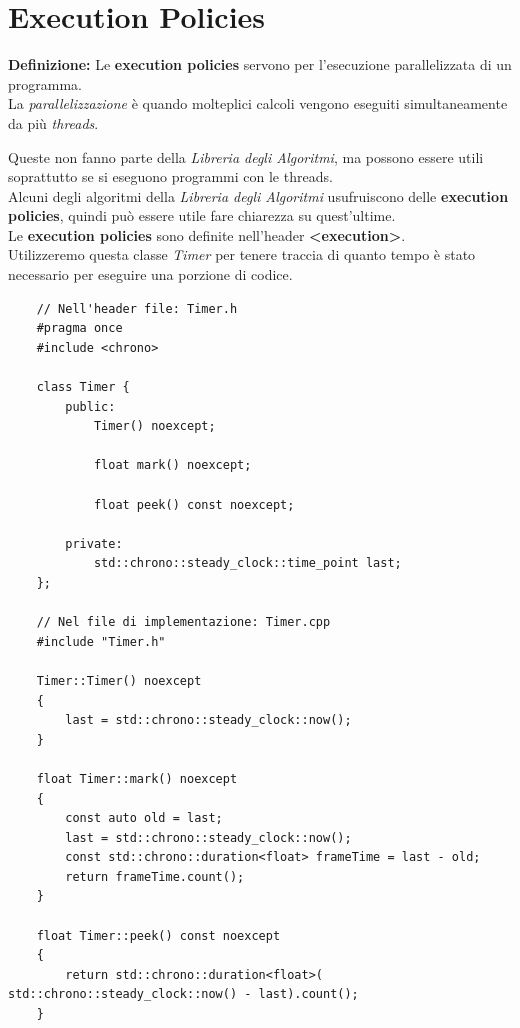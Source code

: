 
\newpage

\section{Execution Policies}

\textsf{\small \textbf{Definizione: } Le \textbf{execution policies} servono per l'esecuzione parallelizzata di un programma. } \\

\textsf{\small La \emph{parallelizzazione} è quando molteplici calcoli vengono eseguiti simultaneamente da più \emph{threads}. } \break

\textsf{\small Queste non fanno parte della \emph{Libreria degli Algoritmi}, ma possono essere utili soprattutto se si eseguono programmi con le threads.} \\

\textsf{\small Alcuni degli algoritmi della \emph{Libreria degli Algoritmi} usufruiscono delle \textbf{execution policies}, quindi può essere utile fare chiarezza su quest'ultime.} \\

\textsf{\small Le \textbf{execution policies} sono definite nell'header \textbf{<execution>}.} \\

\textsf{\small Utilizzeremo questa classe \emph{Timer} per tenere traccia di quanto tempo è stato necessario per eseguire una porzione di codice.} \\

\begin{lstlisting}
	// Nell'header file: Timer.h
	#pragma once
	#include <chrono>
	
	class Timer {
		public:
			Timer() noexcept;
			
			float mark() noexcept;
			
			float peek() const noexcept;
			
		private:
			std::chrono::steady_clock::time_point last;
	};

	// Nel file di implementazione: Timer.cpp
	#include "Timer.h"
	
	Timer::Timer() noexcept
	{
		last = std::chrono::steady_clock::now();
	}
	
	float Timer::mark() noexcept
	{
		const auto old = last;
		last = std::chrono::steady_clock::now();
		const std::chrono::duration<float> frameTime = last - old;
		return frameTime.count();
	}
	
	float Timer::peek() const noexcept
	{
		return std::chrono::duration<float>( std::chrono::steady_clock::now() - last).count();
	}
\end{lstlisting}

